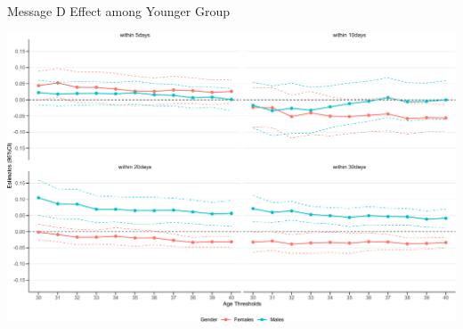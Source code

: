 \documentclass[
      aspectratio=169,
        12pt,
    ]{beamer}
\begin{document}
\begin{frame}{Message D Effect among Younger Group}
\protect\hypertarget{message-d-effect-among-younger-group-1}{}
\begin{center}\includegraphics[width=0.75\linewidth]{report_files/figure-beamer/plotD-change-age-threshold-secondary-1} \end{center}
\end{frame}
\end{document}
